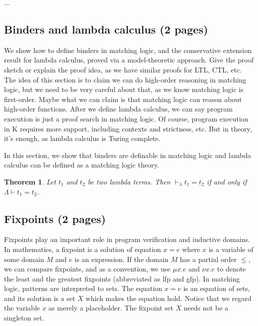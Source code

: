 \documentclass[letter,12pt]{article}
\newtheorem{theorem}{Theorem}
\newcommand{\K}{K\xspace}
\newcommand{\MLLambda}{\mathsf{\Lambda}}
\begin{document}
...

\subsection{Binders and lambda calculus (2 pages)}

We show how to define binders in matching logic, and
the conservative extension result for lambda calculus,
proved via a model-theoretic approach.
Give the proof sketch or explain the proof idea,
as we have similar proofs for LTL, CTL, etc.
The idea of this section is to claim we can do high-order reasoning
in matching logic, but we need to be very careful about that,
as we know matching logic is first-order.
Maybe what we can claim is that matching logic can reason about high-order functions.
After we define lambda calculus, we can say program execution is just a proof search
in matching logic.
Of course, program execution in \K requires more support, including contexts and strictness,
etc. 
But in theory, it's enough, as lambda calculus is Turing complete.


In this section, we show that binders are definable in matching logic and
lambda calculus can be defined as a matching logic theory.
\begin{theorem}
Let $t_1$ and $t_2$ be two lambda terms. Then
$\vdash_\lambda t_1 = t_2$ if and only if
$\MLLambda \vdash t_1 = t_2$.
\end{theorem}

\subsection{Fixpoints (2 pages)}

Fixpoints play an important role in program verification and inductive domains.
In mathematics, a fixpoint is a solution of equation $x = e$ where $x$ is a variable
of some domain $M$ and $e$ is an expression.
If the domain $M$ has a partial order $\le$,
we can compare fixpoints, and as a convention,
we use $\mu x . e$ and $\nu x . e$ to denote the least and the greatest fixpoints 
(abbreviated as lfp and gfp).
In matching logic, patterns are interpreted to sets.
The equation $x = e$ is an equation of sets, and its solution
is a set $X$ which makes the equation hold.
Notice that we regard the variable $x$ as merely a placeholder.
The fixpoint set $X$ needs not be a singleton set.
\end{document}
